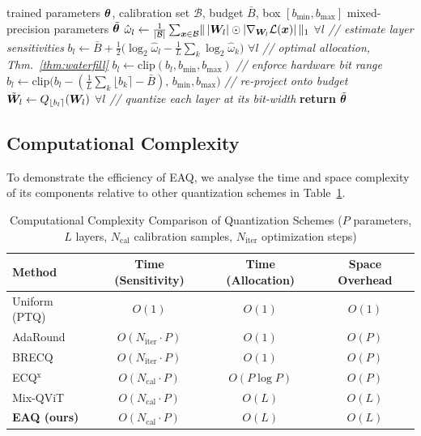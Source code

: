\begin{algorithm}[!t]
\caption{Explanation-Aware Quantization (EAQ)}
\label{alg:eaq}
\begin{algorithmic}[1]
\REQUIRE trained parameters $\bm{\theta}$, calibration set $\mathcal B$, budget
$\bar B$, box $[b_{\min},b_{\max}]$
\ENSURE mixed-precision parameters $\tilde{\bm{\theta}}$
\STATE $\hat\omega_l\leftarrow\frac1{|\mathcal B|}\sum_{\bm{x}\in\mathcal B}
\lVert\,|\bm{W}_l|\odot|\nabla_{\bm{W}_l}\mathcal L(\bm{x})|\,\rVert_1$ \quad$\forall l$
\hfill{\small\textit{// estimate layer sensitivities}}
\STATE $b_l\leftarrow\bar B+\tfrac12\bigl(\log_2\hat\omega_l-\tfrac1L\sum_k
\log_2\hat\omega_k\bigr)$ \quad$\forall l$
\hfill{\small\textit{// optimal allocation, Thm.~\ref{thm:waterfill}}}
\STATE $b_l\leftarrow\mathrm{clip}(b_l,b_{\min},b_{\max})$
\hfill{\small\textit{// enforce hardware bit range}}
  \STATE $b_l\leftarrow\mathrm{clip}\bigl(b_l-(\tfrac1L\sum_k\lfloor b_k\rceil
  -\bar B),\,b_{\min},b_{\max}\bigr)$
  \hfill{\small\textit{// re-project onto budget}}
\ENDWHILE
\STATE $\tilde{\bm{W}}_l\leftarrow Q_{\lfloor b_l\rceil}(\bm{W}_l)$ \quad$\forall l$
\hfill{\small\textit{// quantize each layer at its bit-width}}
\STATE \textbf{return} $\tilde{\bm{\theta}}$
\end{algorithmic}
\end{algorithm}

\subsection{Computational Complexity}
\label{sec:complexity}
To demonstrate the efficiency of EAQ, we analyse the time and space complexity of its components relative to other quantization schemes in Table~\ref{tab:complexity}.

\begin{table}[!h]
\caption{Computational Complexity Comparison of Quantization Schemes ($P$ parameters, $L$ layers, $N_{\mathrm{cal}}$ calibration samples, $N_{\mathrm{iter}}$ optimization steps)}
\label{tab:complexity}
\centering
\begin{tabular}{lccc}
\hline
\textbf{Method} & \textbf{Time (Sensitivity)} & \textbf{Time (Allocation)} & \textbf{Space Overhead} \\
\hline
Uniform (PTQ) & $O(1)$ & $O(1)$ & $O(1)$ \\
AdaRound \cite{nagel2020adaround} & $O(N_{\mathrm{iter}} \cdot P)$ & $O(1)$ & $O(P)$ \\
BRECQ \cite{li2021brecq} & $O(N_{\mathrm{iter}} \cdot P)$ & $O(1)$ & $O(P)$ \\
ECQ$^{\mathrm{x}}$ \cite{becking2022ecq} & $O(N_{\mathrm{cal}} \cdot P)$ & $O(P \log P)$ & $O(P)$ \\
Mix-QViT \cite{ranjan2025mixqvit} & $O(N_{\mathrm{cal}} \cdot P)$ & $O(L)$ & $O(L)$ \\
\textbf{EAQ (ours)} & $O(N_{\mathrm{cal}} \cdot P)$ & $O(L)$ & $O(L)$ \\
\hline
\end{tabular}
\end{table}

